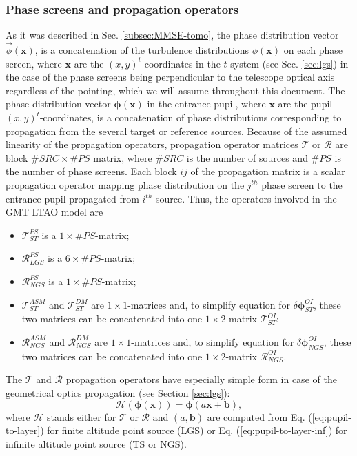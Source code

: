 \subsubsection{Phase screens and propagation operators}
\label{subsubsec:phase-and-propagation}

As it was described in Sec. \ref{subsec:MMSE-tomo}, the phase
distribution vector $\vec{\phi}(\bm{x})$, is a concatenation of the
turbulence distributions $\phi(\bm{x})$ on each phase screen,
where $\bm{x}$ are the $(x,y)^{t}$-coordinates in the $t$-system (see Sec.
\ref{sec:lgs}) in the case of the phase screens being perpendicular to
the telescope optical axis regardless of the pointing, which we will assume
throughout this document. The phase distribution vector
$\bm{\phi} (\bm{x})$ in the entrance pupil, where $\bm{x}$ are the
pupil $(x,y)^{t}$-coordinates, is a concatenation of phase distributions
corresponding to propagation from the several target or reference sources.
Because of the assumed linearity of the propagation operators, propagation
operator matrices $\mathcal{T}$ or $\mathcal{R}$ are
block $\#SRC\times\#PS$ matrix, where $\#SRC$ is the number of sources and
$\#PS$ is the number of phase screens. Each block $ij$ of the propagation matrix
is a scalar propagation operator mapping phase distribution on the $j^{th}$
phase screen to the entrance pupil propagated from $i^{th}$ source. Thus, the
operators involved in the GMT LTAO model are
\begin{itemize}
	\item $\mathcal{T}_{ST}^{PS}$ is a $1 \times \#PS$-matrix;
	\item $\mathcal{R}_{LGS}^{PS}$ is a $6 \times \#PS$-matrix;
	\item $\mathcal{R}_{NGS}^{PS}$ is a $1 \times \#PS$-matrix;
	\item $\mathcal{T}_{ST}^{ASM}$ and $\mathcal{T}_{ST}^{DM}$ are $1 \times
	1$-matrices and, to simplify equation for $\delta \bm{\phi}_{ST}^{OI}$, these
	two matrices can be concatenated into one $1 \times 2$-matrix
	$\mathcal{T}_{ST}^{OI}$;
	\item $\mathcal{R}_{NGS}^{ASM}$ and $\mathcal{R}_{NGS}^{DM}$ are $1 \times
	1$-matrices and, to simplify equation for $\delta \bm{\phi}_{NGS}^{OI}$, these
	two matrices can be concatenated into one $1 \times 2$-matrix
	$\mathcal{R}_{NGS}^{OI}$.
\end{itemize}

The $\mathcal{T}$ and $\mathcal{R}$ propagation operators have especially
simple form in case of the geometrical optics propagation (see Section
\ref{sec:lgs}):
\begin{equation} \label{eq:shift-propagator}
	\mathcal{H}(\bm{\phi}(\bm{x})) = \bm{\phi}(a\bm{x}+\bm{b}),
\end{equation}
where $\mathcal{H}$ stands either for $\mathcal{T}$ or $\mathcal{R}$ and
$(a,\bm{b})$ are computed from Eq. (\ref{eq:pupil-to-layer}) for finite
altitude point source (LGS) or Eq. (\ref{eq:pupil-to-layer-inf}) for infinite
altitude point source (TS or NGS).

